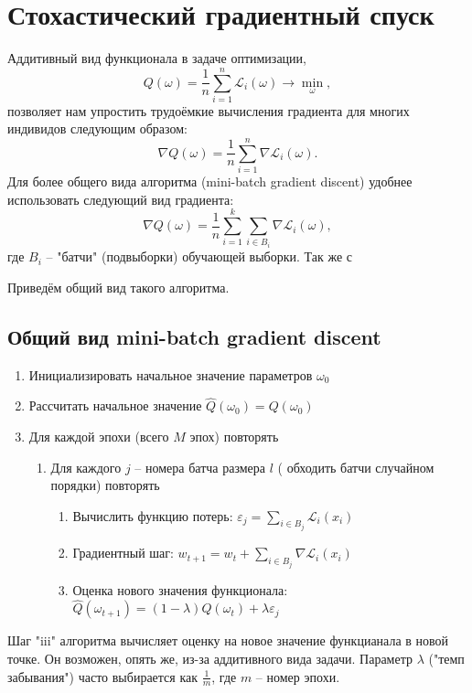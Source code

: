 \documentclass{article}
\begin{document}
\section{Стохастический градиентный спуск}
Аддитивный вид функционала в задаче оптимизации,
$$
Q(\omega) = \frac{1}{n}\sum\limits_{i=1}^{n}\mathcal{L}_i(\omega) \to \underset{\omega}{\min},
$$
позволяет нам упростить трудоёмкие вычисления градиента для многих индивидов следующим образом:
$$
\nabla Q(\omega) = \frac{1}{n}\sum\limits_{i=1}^{n}\nabla \mathcal{L}_i(\omega).
$$
Для более общего вида алгоритма (mini-batch gradient discent) удобнее использовать следующий вид градиента:
$$
\nabla Q(\omega) =\frac{1}{n} \sum\limits_{i=1}^{k}\sum\limits_{i\in B_i}\nabla \mathcal{L}_i(\omega),
$$
где $B_i$ -- "батчи" (подвыборки) обучающей выборки. 
Так же с 

Приведём общий вид такого алгоритма.
\subsection{Общий вид mini-batch gradient discent}
\begin{enumerate}
    \item Инициализировать начальное значение параметров $\omega_0$
    \item Рассчитать начальное значение $\hat{Q}(\omega_0)=Q(\omega_0)$
    \item Для каждой эпохи  (всего $M$ эпох) повторять
    \begin{enumerate}
        \item Для каждого $j$ -- номера батча размера $l$ ( обходить батчи случайном порядки) повторять
        \begin{enumerate}
            \item Вычислить функцию потерь: $\varepsilon_j = \sum\limits_{i\in B_j}\mathcal{L}_i(x_i)$ 
            \item Градиентный шаг: $w_{t+1} = w_{t} + \sum\limits_{i \in B_j}\nabla \mathcal{L}_i(x_i)$
            
                
                
                \item Оценка нового значения функционала: $\hat{Q}(\omega_{t+1})=(1-\lambda)Q(\omega_t) + \lambda \varepsilon_j$         
            
        \end{enumerate}
    \end{enumerate}
\end{enumerate}
Шаг "iii" алгоритма вычисляет оценку на новое значение функцианала в новой точке. Он возможен, опять же, из-за аддитивного вида задачи. Параметр $\lambda$ ("темп забывания") часто выбирается как $\frac{1}{m}$, где $m$ -- номер эпохи.
\end{document}
